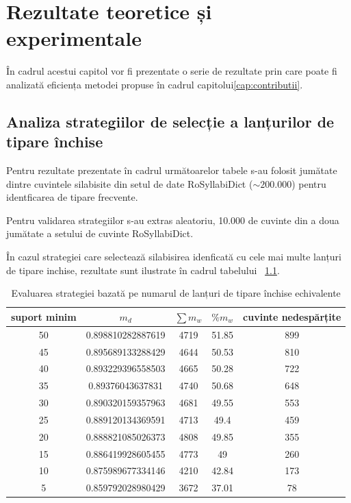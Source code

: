 \chapter{Rezultate teoretice și experimentale}
\label{cap:rezultate}

În cadrul acestui capitol vor fi prezentate o serie de rezultate prin care poate fi analizată eficiența metodei propuse în cadrul capitolui\ref{cap:contributii}.

\section{Analiza strategiilor de selecție a lanțurilor de tipare închise}

Pentru rezultate prezentate în cadrul următoarelor tabele s-au folosit jumătate dintre cuvintele silabisite din setul de date RoSyllabiDict ($\sim200.000$) pentru identficarea de tipare frecvente. 

Pentru validarea strategiilor s-au extras aleatoriu, 10.000 de cuvinte din a doua jumătate a setului de cuvinte RoSyllabiDict.

În cazul strategiei care selectează silabisirea idenficată cu cele mai multe lanțuri de tipare inchise, rezultate sunt ilustrate în cadrul tabelului ~\ref{table:counting}.

\begin{table}[h!]
\centering
\begin{tabular}{|c|c|c|c|c|}
\hline
suport minim & $m_d$ & $\sum m_w$ & $\%{m_w}$ & cuvinte nedespărțite\\ 
\hline
\hline
50 & 0.898810282887619 & 4719 & 51.85 & 899\\ 
\hline
45 & 0.895689133288429 & 4644 & 50.53 & 810\\ 
\hline
40 & 0.893229396558503 & 4665 & 50.28 & 722\\ 
\hline
35 & 0.89376043637831 & 4740 & 50.68 & 648\\ 
\hline
30 & 0.890320159357963 & 4681 & 49.55 & 553\\ 
\hline
25 & 0.889120134369591 & 4713 & 49.4 & 459\\ 
\hline
20 & 0.888821085026373 & 4808 & 49.85 & 355\\ 
\hline
15 & 0.886419928605455 & 4773 & 49 & 260\\ 
\hline
10 & 0.875989677334146 & 4210 & 42.84 & 173\\ 
\hline
5 & 0.859792028980429 & 3672 & 37.01 & 78\\ 
\hline\end{tabular}
\caption{Evaluarea strategiei bazată pe numarul de lanțuri de tipare închise echivalente} 
\label{table:counting}
\end{table}

